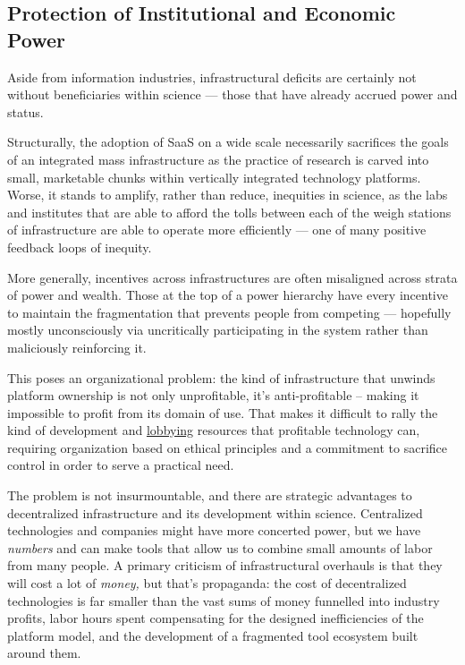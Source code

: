 \documentclass[notoc]{tufte-book}
\begin{document}
\subsection{Protection of Institutional and Economic
Power}

Aside from information industries, infrastructural deficits are
certainly not without beneficiaries within science --- those that have
already accrued power and status.

Structurally, the adoption of SaaS on a wide scale necessarily
sacrifices the goals of an integrated mass infrastructure as the
practice of research is carved into small, marketable chunks within
vertically integrated technology platforms. Worse, it stands to amplify,
rather than reduce, inequities in science, as the labs and institutes
that are able to afford the tolls between each of the weigh stations of
infrastructure are able to operate more efficiently --- one of many
positive feedback loops of inequity.

More generally, incentives across infrastructures are often misaligned
across strata of power and wealth. Those at the top of a power hierarchy
have every incentive to maintain the fragmentation that prevents people
from competing --- hopefully mostly unconsciously via uncritically
participating in the system rather than maliciously reinforcing it.

This poses an organizational problem: the kind of infrastructure that
unwinds platform ownership is not only unprofitable, it's
anti-profitable -- making it impossible to profit from its domain of
use. That makes it difficult to rally the kind of development and
\href{https://www.snsi.info/}{lobbying} resources that profitable
technology can, requiring organization based on ethical principles and a
commitment to sacrifice control in order to serve a practical need.

The problem is not insurmountable, and there are strategic advantages to
decentralized infrastructure and its development within science.
Centralized technologies and companies might have more concerted power,
but we have \emph{numbers} and can make tools that allow us to combine
small amounts of labor from many people. A primary criticism of
infrastructural overhauls is that they will cost a lot of \emph{money,}
but that's propaganda: the cost of decentralized technologies is far
smaller than the vast sums of money funnelled into industry profits,
labor hours spent compensating for the designed inefficiencies of the
platform model, and the development of a fragmented tool ecosystem built
around them.
\end{document}
